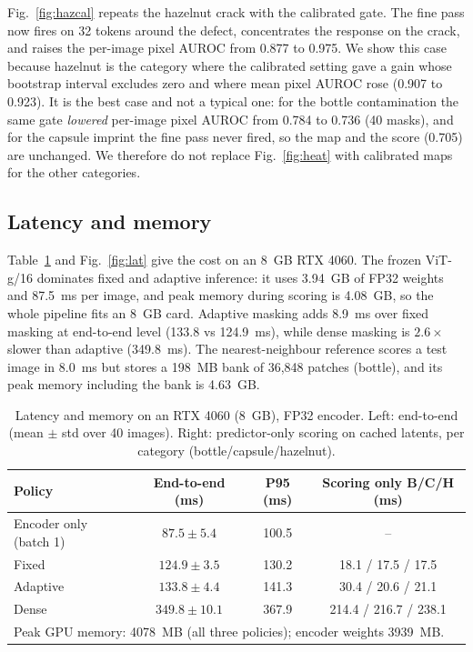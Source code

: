\documentclass[conference]{IEEEtran}
\begin{document}
Fig.~\ref{fig:hazcal} repeats the hazelnut crack with the calibrated gate. The fine pass now fires on 32 tokens around the defect, concentrates the response on the crack, and raises the per-image pixel AUROC from 0.877 to 0.975. We show this case because hazelnut is the category where the calibrated setting gave a gain whose bootstrap interval excludes zero and where mean pixel AUROC rose (0.907 to 0.923). It is the best case and not a typical one: for the bottle contamination the same gate \emph{lowered} per-image pixel AUROC from 0.784 to 0.736 (40 masks), and for the capsule imprint the fine pass never fired, so the map and the score (0.705) are unchanged. We therefore do not replace Fig.~\ref{fig:heat} with calibrated maps for the other categories.

\subsection{Latency and memory}
Table~\ref{tab:latency} and Fig.~\ref{fig:lat} give the cost on an 8~GB RTX 4060. The frozen ViT-g/16 dominates fixed and adaptive inference: it uses 3.94~GB of FP32 weights and 87.5~ms per image, and peak memory during scoring is 4.08~GB, so the whole pipeline fits an 8~GB card. Adaptive masking adds 8.9~ms over fixed masking at end-to-end level (133.8 vs 124.9~ms), while dense masking is $2.6\times$ slower than adaptive (349.8~ms). The nearest-neighbour reference scores a test image in 8.0~ms but stores a 198~MB bank of 36{,}848 patches (bottle), and its peak memory including the bank is 4.63~GB.

\begin{table}[t]
\caption{Latency and memory on an RTX 4060 (8~GB), FP32 encoder. Left: end-to-end (mean $\pm$ std over 40 images). Right: predictor-only scoring on cached latents, per category (bottle/capsule/hazelnut).}
\label{tab:latency}
\centering
\scriptsize
\setlength{\tabcolsep}{3pt}
\begin{tabular}{lccc}
\hline
\textbf{Policy} & \textbf{End-to-end (ms)} & \textbf{P95 (ms)} & \textbf{Scoring only B/C/H (ms)} \\
\hline
Encoder only (batch 1) & $87.5\pm5.4$  & 100.5 & -- \\
Fixed    & $124.9\pm3.5$  & 130.2 & 18.1 / 17.5 / 17.5 \\
Adaptive & $133.8\pm4.4$  & 141.3 & 30.4 / 20.6 / 21.1 \\
Dense    & $349.8\pm10.1$ & 367.9 & 214.4 / 216.7 / 238.1 \\
\hline
\multicolumn{4}{l}{Peak GPU memory: 4078~MB (all three policies); encoder weights 3939~MB.}
\end{tabular}
\end{table}
\end{document}
